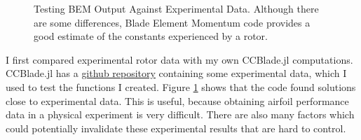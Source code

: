 \documentclass{article}
\begin{document}
\begin{figure}
  \centering

  \hspace{1em}
  \caption{Testing BEM Output Against Experimental Data. \newline Although there are some differences, Blade Element Momentum code provides a good estimate of the constants experienced by a rotor.}
  \label{fig:2}
\end{figure}

I first compared experimental rotor data with my own CCBlade.jl computations. CCBlade.jl has a \href{https://github.com/byuflowlab/CCBlade.jl}{github repository} containing some experimental data, which I used to test the functions I created. Figure \ref{fig:2} shows that the code found solutions close to experimental data. This is useful, because obtaining airfoil performance data in a physical experiment is very difficult. There are also many factors which could potentially invalidate these experimental results that are hard to control. \newline
\end{document}
